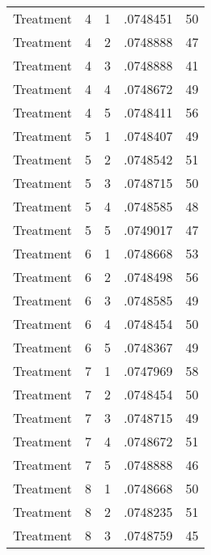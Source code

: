 \begin{tabular}{l*{4}{c}}
Treatment           &           4&           1&    .0748451&          50\\
Treatment           &           4&           2&    .0748888&          47\\
Treatment           &           4&           3&    .0748888&          41\\
Treatment           &           4&           4&    .0748672&          49\\
Treatment           &           4&           5&    .0748411&          56\\
Treatment           &           5&           1&    .0748407&          49\\
Treatment           &           5&           2&    .0748542&          51\\
Treatment           &           5&           3&    .0748715&          50\\
Treatment           &           5&           4&    .0748585&          48\\
Treatment           &           5&           5&    .0749017&          47\\
Treatment           &           6&           1&    .0748668&          53\\
Treatment           &           6&           2&    .0748498&          56\\
Treatment           &           6&           3&    .0748585&          49\\
Treatment           &           6&           4&    .0748454&          50\\
Treatment           &           6&           5&    .0748367&          49\\
Treatment           &           7&           1&    .0747969&          58\\
Treatment           &           7&           2&    .0748454&          50\\
Treatment           &           7&           3&    .0748715&          49\\
Treatment           &           7&           4&    .0748672&          51\\
Treatment           &           7&           5&    .0748888&          46\\
Treatment           &           8&           1&    .0748668&          50\\
Treatment           &           8&           2&    .0748235&          51\\
Treatment           &           8&           3&    .0748759&          45\\

\end{tabular}
